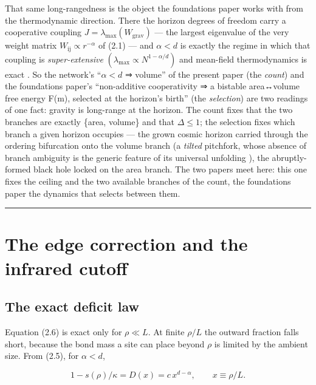 \documentclass[aps,prd,preprint,nofootinbib,superscriptaddress]{revtex4-2}
\begin{document}
That same long-rangedness is the object the foundations paper works with
from the thermodynamic direction. There the horizon degrees of freedom
carry a cooperative coupling
\(J = \lambda _{\mathrm{max}}(W_{\mathrm{grav}})\) --- the largest
eigenvalue of the very weight matrix
\(W_{\mathrm{ij}} \propto  r^{-\alpha }\) of (2.1) --- and
\(\alpha  < d\) is exactly the regime in which that coupling is
\emph{super-extensive}
\((\lambda _{\mathrm{max}} \propto  N^{1-\alpha /d})\) and mean-field
thermodynamics is exact \citep{Campa:2009jxa}. So the network's
``\(\alpha  < d\) ⇒ volume'' of the present paper (the \emph{count}) and
the foundations paper's ``non-additive cooperativity ⇒ a bistable
area↔volume free energy F(m), selected at the horizon's birth'' (the
\emph{selection}) are two readings of one fact: gravity is long-range at
the horizon. The count fixes that the two branches are exactly \{area,
volume\} and that \(\Delta  \leq  1\); the selection fixes which branch
a given horizon occupies --- the grown cosmic horizon carried through
the ordering bifurcation onto the volume branch (a \emph{tilted}
pitchfork, whose absence of branch ambiguity is the generic feature of
its universal unfolding \citep{Golubitsky:1985}), the abruptly-formed
black hole locked on the area branch. The two papers meet here: this one
fixes the ceiling and the two available branches of the count, the
foundations paper the dynamics that selects between them.

\begin{center}\rule{0.5\linewidth}{0.5pt}\end{center}

\section{The edge correction and the infrared cutoff}\label{sec-5}

\subsection{The exact deficit law}\label{sec-5-1}

Equation (2.6) is exact only for \(\rho  \ll  L\). At finite \(\rho /L\)
the outward fraction falls short, because the bond mass a site can place
beyond \(\rho\) is limited by the ambient size. From (2.5), for
\(\alpha  < d\),

\begin{equation}1 - s(\rho)/\kappa = D(x) = c\, x^{d-\alpha}, \qquad x \equiv \rho/L. \tag{5.1}\end{equation}
\end{document}
